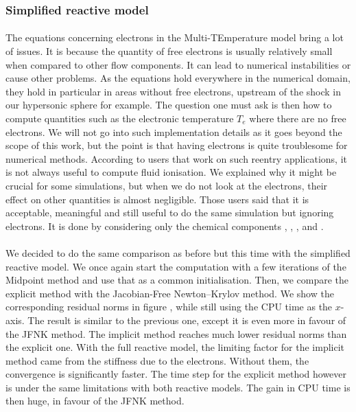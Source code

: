       \subsubsection{Simplified reactive model}

        \paragraph{}
        The equations concerning electrons in the Multi-TEmperature model bring a lot of issues.
        It is because the quantity of free electrons is usually relatively small when compared to other flow components.
        It can lead to numerical instabilities or cause other problems.
        As the equations hold everywhere in the numerical domain, they hold in particular in areas without free electrons, upstream of the shock in our hypersonic sphere for example.
        The question one must ask is then how to compute quantities such as the electronic temperature $T_e$ where there are no free electrons.
        We will not go into such implementation details as it goes beyond the scope of this work, but the point is that having electrons is quite troublesome for numerical methods.
        According to users that work on such reentry applications, it is not always useful to compute fluid ionisation.
        We explained why it might be crucial for some simulations, but when we do not look at the electrons, their effect on other quantities is almost negligible.
        Those users said that  it is acceptable, meaningful and still useful to do the same simulation but ignoring electrons.
        It is done by considering only the chemical components , , ,  and .

        \paragraph{}
        We decided to do the same comparison as before but this time with the simplified reactive model.
        We once again start the computation with a few iterations of the Midpoint method and use that as a common initialisation.
        Then, we compare the explicit method with the Jacobian-Free Newton--Krylov method.
        We show the corresponding residual norms in figure , while still using the CPU time as the $x$-axis.
        The result is similar to the previous one, except it is even more in favour of the JFNK method.
        The implicit method reaches much lower residual norms than the explicit one.
        With the full reactive model, the limiting factor for the implicit method came from the stiffness due to the electrons.
        Without them, the convergence is significantly faster.
        The time step for the explicit method however is under the same limitations with both reactive models.
        The gain in CPU time is then huge, in favour of the JFNK method.
